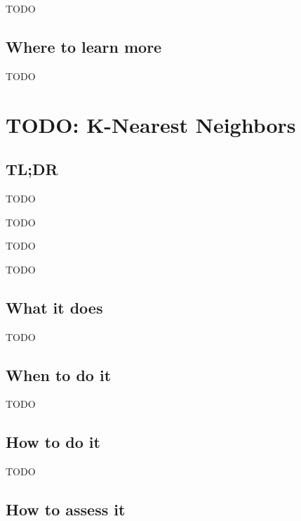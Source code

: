 \documentclass[
]{book}
\providecommand{\tightlist}{%
  \setlength{\itemsep}{0pt}\setlength{\parskip}{0pt}}
\begin{document}
TODO

\hypertarget{where-to-learn-more-6}{%
\section{Where to learn more}\label{where-to-learn-more-6}}

TODO

\hypertarget{k-nearest-neighbors}{%
\chapter{TODO: K-Nearest Neighbors}\label{k-nearest-neighbors}}

\hypertarget{tldr-7}{%
\section{TL;DR}\label{tldr-7}}

\begin{description}
\tightlist
\item[What it does]
TODO
\item[When to do it]
TODO
\item[How to do it]
TODO
\item[How to assess it]
TODO
\end{description}

\hypertarget{what-it-does-7}{%
\section{What it does}\label{what-it-does-7}}

TODO

\hypertarget{when-to-do-it-7}{%
\section{When to do it}\label{when-to-do-it-7}}

TODO

\hypertarget{how-to-do-it-7}{%
\section{How to do it}\label{how-to-do-it-7}}

TODO

\hypertarget{how-to-assess-it-7}{%
\section{How to assess it}\label{how-to-assess-it-7}}
\end{document}
